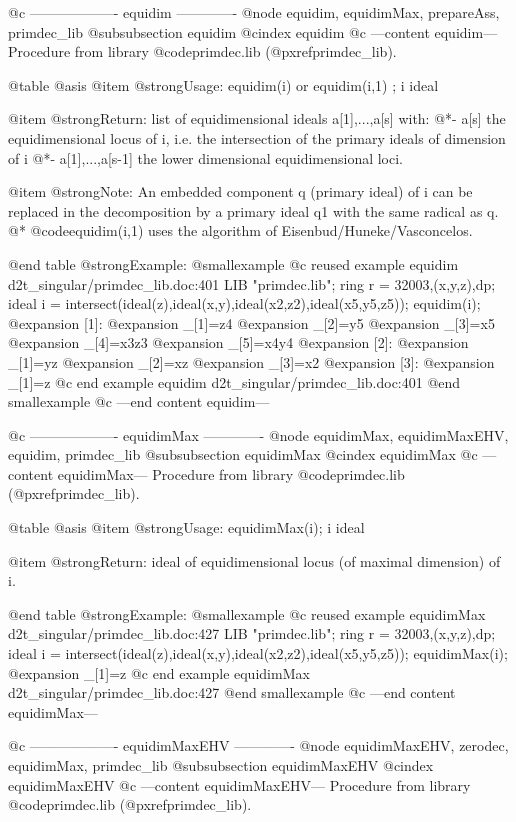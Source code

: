 @c ------------------- equidim -------------
@node equidim, equidimMax, prepareAss, primdec_lib
@subsubsection equidim
@cindex equidim
@c ---content equidim---
Procedure from library @code{primdec.lib} (@pxref{primdec_lib}).

@table @asis
@item @strong{Usage:}
equidim(i) or equidim(i,1) ; i ideal

@item @strong{Return:}
list of equidimensional ideals a[1],...,a[s] with:
@*- a[s] the equidimensional locus of i, i.e. the intersection
of the primary ideals of dimension of i
@*- a[1],...,a[s-1] the lower dimensional equidimensional loci.

@item @strong{Note:}
An embedded component q (primary ideal) of i can be replaced in the
decomposition by a primary ideal q1 with the same radical as q. @*
@code{equidim(i,1)} uses the algorithm of Eisenbud/Huneke/Vasconcelos.

@end table
@strong{Example:}
@smallexample
@c reused example equidim d2t_singular/primdec_lib.doc:401 
LIB "primdec.lib";
ring  r = 32003,(x,y,z),dp;
ideal i = intersect(ideal(z),ideal(x,y),ideal(x2,z2),ideal(x5,y5,z5));
equidim(i);
@expansion{} [1]:
@expansion{}    _[1]=z4
@expansion{}    _[2]=y5
@expansion{}    _[3]=x5
@expansion{}    _[4]=x3z3
@expansion{}    _[5]=x4y4
@expansion{} [2]:
@expansion{}    _[1]=yz
@expansion{}    _[2]=xz
@expansion{}    _[3]=x2
@expansion{} [3]:
@expansion{}    _[1]=z
@c end example equidim d2t_singular/primdec_lib.doc:401
@end smallexample
@c ---end content equidim---

@c ------------------- equidimMax -------------
@node equidimMax, equidimMaxEHV, equidim, primdec_lib
@subsubsection equidimMax
@cindex equidimMax
@c ---content equidimMax---
Procedure from library @code{primdec.lib} (@pxref{primdec_lib}).

@table @asis
@item @strong{Usage:}
equidimMax(i); i ideal

@item @strong{Return:}
ideal of equidimensional locus (of maximal dimension) of i.

@end table
@strong{Example:}
@smallexample
@c reused example equidimMax d2t_singular/primdec_lib.doc:427 
LIB "primdec.lib";
ring  r = 32003,(x,y,z),dp;
ideal i = intersect(ideal(z),ideal(x,y),ideal(x2,z2),ideal(x5,y5,z5));
equidimMax(i);
@expansion{} _[1]=z
@c end example equidimMax d2t_singular/primdec_lib.doc:427
@end smallexample
@c ---end content equidimMax---

@c ------------------- equidimMaxEHV -------------
@node equidimMaxEHV, zerodec, equidimMax, primdec_lib
@subsubsection equidimMaxEHV
@cindex equidimMaxEHV
@c ---content equidimMaxEHV---
Procedure from library @code{primdec.lib} (@pxref{primdec_lib}).

